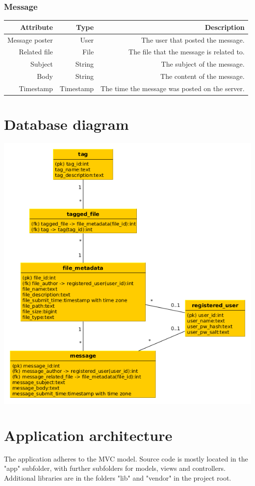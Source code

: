 \documentclass[10pt,a4paper]{article}
\begin{document}
\subsubsection{Message}
\begin{tabularx}{\textwidth}{|R|R|R|} \hline
\textbf{Attribute} & \textbf{Type} & \textbf{Description}\\ \hline
Message poster & User & The user that posted the message.\\ \hline
Related file & File & The file that the message is related to.\\ \hline
Subject & String & The subject of the message.\\ \hline
Body & String & The content of the message.\\ \hline
Timestamp & Timestamp & The time the message was posted on the server.\\ \hline
\end{tabularx}

\section{Database diagram}
\includegraphics[scale=0.7]{diagrams/database.png}

\section{Application architecture}
The application adheres to the MVC model. Source code is mostly located in the "app" subfolder, with further subfolders for models, views and controllers. Additional libraries are in the folders "lib" and "vendor" in the project root. 
\end{document}
